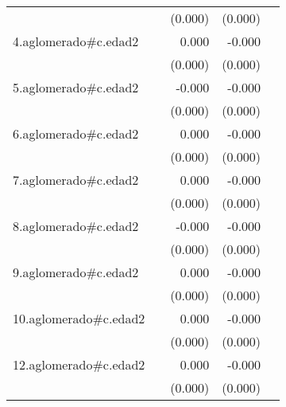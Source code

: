 {\begin{longtable}{l*{4}{D{.}{.}{-1}}}
            &                     &     (0.000)         &     (0.000)         &                     \\
\addlinespace
4.aglomerado#c.edad2&                     &       0.000         &      -0.000\sym{**} &                     \\
            &                     &     (0.000)         &     (0.000)         &                     \\
\addlinespace
5.aglomerado#c.edad2&                     &      -0.000         &      -0.000         &                     \\
            &                     &     (0.000)         &     (0.000)         &                     \\
\addlinespace
6.aglomerado#c.edad2&                     &       0.000         &      -0.000         &                     \\
            &                     &     (0.000)         &     (0.000)         &                     \\
\addlinespace
7.aglomerado#c.edad2&                     &       0.000         &      -0.000\sym{*}  &                     \\
            &                     &     (0.000)         &     (0.000)         &                     \\
\addlinespace
8.aglomerado#c.edad2&                     &      -0.000         &      -0.000\sym{*}  &                     \\
            &                     &     (0.000)         &     (0.000)         &                     \\
\addlinespace
9.aglomerado#c.edad2&                     &       0.000         &      -0.000         &                     \\
            &                     &     (0.000)         &     (0.000)         &                     \\
\addlinespace
10.aglomerado#c.edad2&                     &       0.000         &      -0.000         &                     \\
            &                     &     (0.000)         &     (0.000)         &                     \\
\addlinespace
12.aglomerado#c.edad2&                     &       0.000         &      -0.000         &                     \\
            &                     &     (0.000)         &     (0.000)         &                     \\

\end{longtable}}
